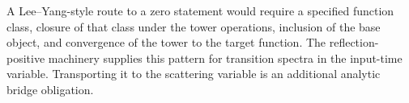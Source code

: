 \begin{principle}
\label{prin:innovation-input-modular-positive-zero-target}
A Lee--Yang-style route to a zero statement would require a specified
function class, closure of that class under the tower operations, inclusion
of the base object, and convergence of the tower to the target function.
The reflection-positive machinery supplies this pattern for transition
spectra in the input-time variable. Transporting it to the scattering
variable is an additional analytic bridge obligation.
\end{principle}

